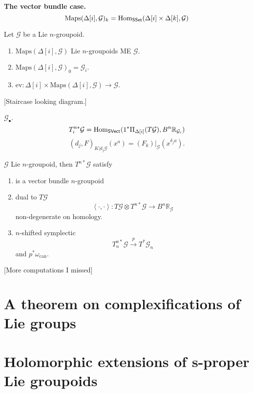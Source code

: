 {\medskip\noindent
{\bf The vector bundle case.}
$$
\text{Maps}(\Delta[i],\mathcal{G})_k=
\mathop{\mathrm{Hom}}\nolimits_{\mathsf{SSet}}(\Delta[i]\times\Delta[k],\mathcal{G})
$$
\begin{proposition}
\label{proposition-on-an-n-Lie-groupoid}
Let $\mathcal{G}$ be a Lie $n$-groupoid.
\begin{enumerate}
\item $\text{Maps}(\Delta[i],\mathcal{G})$ Lie $n$-groupoids ME $\mathcal{G}$.
\item $\text{Maps}(\Delta[i],\mathcal{G})_0=\mathcal{G}_i$.
\item $\text{ev}:\Delta[i]\times \text{Maps}(\Delta[i],\mathcal{G})\to
\mathcal{G}$.
\end{enumerate}
\end{proposition}

[Staircase looking diagram.]

\begin{definition}
\label{definition-what-is-this}
$\mathcal{G}_\bullet$.
$$
T_i^{n*}\mathcal{G}=\mathop{\mathrm{Hom}}\nolimits_{\mathsf{SVect}}(1^*  \Pi_{\Delta[i]}(T\mathcal{G}),
B^n\mathbb{R}_{\mathcal{G}_i})
$$
$$
(d_j,F)_{K|d_j\mathcal{G}}(x^a)=(F_k)|_{\mathcal{G}}(x^{\delta_ja}).
$$
\end{definition}

\begin{proposition}
\label{proposition-properties-of-that}
$\mathcal{G}$ Lie $n$-groupoid, then $T^{n*}\mathcal{G}$ satisfy
\begin{enumerate}
\item is a vector bundle $n$-groupoid
\item dual to $T\mathcal{G}$
$$
\left<\cdot,\cdot\right>:T\mathcal{G} \otimes T^{n*}\mathcal{G}
\to B^n\mathbb{R}_{\mathcal{G}}
$$
non-degenerate on homology.
\item $n$-shifted symplectic
$$
T^{n*}_n\mathcal{G}\overset{p}{\to}T^*\mathcal{G}_n
$$
and $p^*\omega_{\text{can}}$.
\end{enumerate}
\end{proposition}

[More computations I missed]

\section{A theorem on complexifications of Lie groups}

\section{Holomorphic extensions of s-proper Lie groupoids}
\label{section-holomorphic-extensions-of-s-proper-Lie-groupoids}

}

